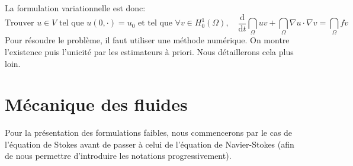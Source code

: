 \medskip
La formulation variationnelle est donc:
\begin{equation}
\text{Trouver } u\in V \text{ tel que } u(0,\cdot)=u_0 \text{ et tel que } \forall v\in H^1_0(\Omega),\quad
\dfrac{\mathrm d}{\mathrm dt}\dint_\Omega uv+\dint_\Omega \nabla u\cdot\nabla v=\dint_\Omega fv
\end{equation}
\medskip
Pour résoudre le problème, il faut utiliser une méthode numérique. On montre l'existence puis l'unicité par les estimateurs à priori. Nous détaillerons cela plus loin.

\medskip
\section{Mécanique des fluides}
Pour la présentation des formulations faibles, nous commencerons par le cas de l'équation de Stokes avant de passer à celui de l'équation de Navier-Stokes (afin de nous permettre d'introduire les notations progressivement).


\medskip
